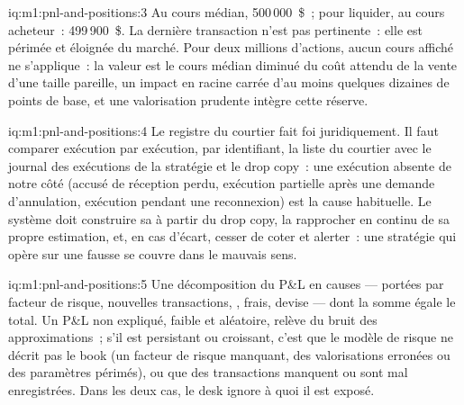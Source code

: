 \begin{solution}{iq:m1:pnl-and-positions:3}
Au cours médian, 500\,000~\$~; pour liquider, au cours acheteur~: 499\,900~\$. La dernière transaction n'est
pas pertinente~: elle est périmée et éloignée du marché. Pour deux millions d'actions, aucun cours affiché
ne s'applique~: la valeur est le cours médian diminué du coût attendu de la vente
d'une taille pareille, un impact en racine carrée d'au moins quelques dizaines de points de base, et une
valorisation prudente intègre cette réserve.
\end{solution}

\begin{solution}{iq:m1:pnl-and-positions:4}
Le registre du courtier fait foi juridiquement. Il faut comparer exécution par exécution, par
identifiant, la liste du courtier avec le journal des exécutions de la stratégie et le
drop copy~: une exécution absente de notre côté (accusé de réception perdu, exécution partielle
après une demande d'annulation, exécution pendant une reconnexion) est la cause habituelle. Le
système doit construire sa  à partir du drop copy, la rapprocher en continu
de sa propre estimation, et, en cas d'écart, cesser de coter et alerter~: une stratégie
qui opère sur une  fausse se couvre dans le mauvais sens.
\end{solution}

\begin{solution}{iq:m1:pnl-and-positions:5}
Une décomposition du P\&L en causes ---  portées par facteur de risque,
nouvelles transactions, , frais, devise --- dont la somme égale le total.
Un P\&L non expliqué, faible et aléatoire, relève du bruit des approximations~;
s'il est persistant ou croissant, c'est que le modèle de risque ne décrit pas le book (un
facteur de risque manquant, des valorisations erronées ou des paramètres périmés), ou que des transactions
manquent ou sont mal enregistrées. Dans les deux cas, le desk ignore à quoi il est
exposé.
\end{solution}

